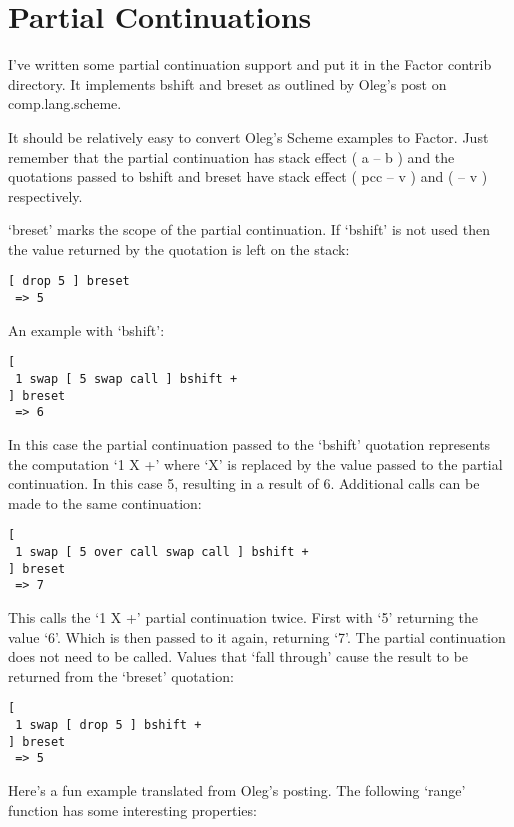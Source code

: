 \chapter{Partial Continuations}\label{partialcontinuations}

I've written some partial continuation support and put it in the
Factor contrib directory. It implements bshift and breset as outlined
by Oleg's post on comp.lang.scheme.


It should be relatively easy to convert Oleg's Scheme examples to
Factor. Just remember that the partial continuation has stack effect (
a -- b ) and the quotations passed to bshift and breset have stack
effect ( pcc -- v ) and ( -- v ) respectively.

`breset' marks the scope of the partial continuation. If `bshift' is
not used then the value returned by the quotation is left on the
stack:

\begin{verbatim}
[ drop 5 ] breset
 => 5
\end{verbatim}


An example with `bshift':

\begin{verbatim}
[
 1 swap [ 5 swap call ] bshift +
] breset
 => 6
\end{verbatim}


In this case the partial continuation passed to the `bshift' quotation
represents the computation `1 X +' where `X' is replaced by the value
passed to the partial continuation. In this case 5, resulting in a
result of 6. Additional calls can be made to the same continuation:

\begin{verbatim}
[
 1 swap [ 5 over call swap call ] bshift +
] breset
 => 7
\end{verbatim}


This calls the `1 X +' partial continuation twice. First with `5'
returning the value `6'. Which is then passed to it again, returning
`7'. The partial continuation does not need to be called. Values that
`fall through' cause the result to be returned from the `breset'
quotation:

\begin{verbatim}
[
 1 swap [ drop 5 ] bshift +
] breset
 => 5
\end{verbatim}


Here's a fun example translated from Oleg's posting. The following
`range' function has some interesting properties:

